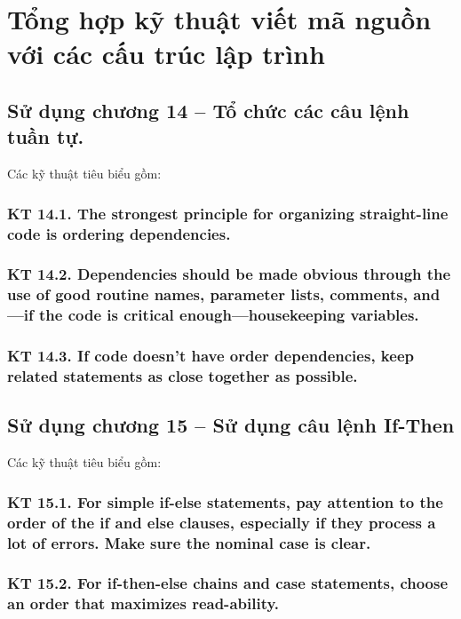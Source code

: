 \documentclass[12pt]{report}
\begin{document}
\tableofcontents 
\newpage 

\section{\bfseries Tổng hợp kỹ thuật viết mã nguồn với các cấu trúc lập trình}

\subsection{Sử dụng chương 14 – Tổ chức các câu lệnh tuần tự.}
\noindent Các kỹ thuật tiêu biểu gồm: 

\subsubsection{KT 14.1. The strongest principle for organizing straight-line code is ordering dependencies.}

\subsubsection{KT 14.2. Dependencies should be made obvious through the use of good routine names, parameter lists, comments, and—if the code is critical enough—housekeeping variables.}

\subsubsection{KT 14.3. If code doesn't have order dependencies, keep related statements as close together as possible.}


\subsection{Sử dụng chương 15 – Sử dụng câu lệnh If-Then}
\noindent Các kỹ thuật tiêu biểu gồm: 

\subsubsection{KT 15.1. For simple if-else statements, pay attention to the order of the if and else clauses, especially if they process a lot of errors. Make sure the nominal case is clear.}

\subsubsection{KT 15.2. For if-then-else chains and case statements, choose an order that maximizes read-ability.}
\end{document}
